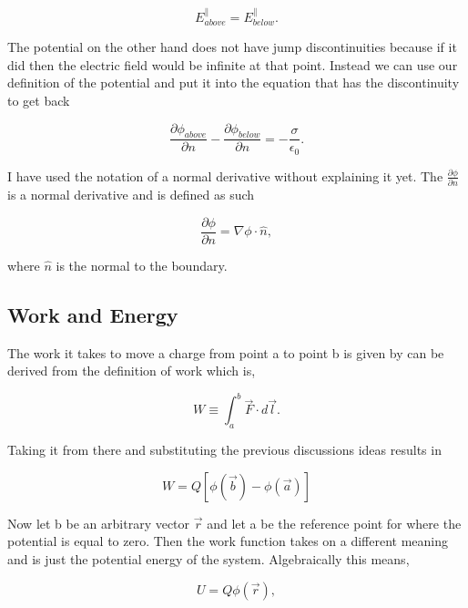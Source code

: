\documentclass[preprint, review,12pt]{elsarticle}
\begin{document}
\begin{equation}
    E_{above}^\parallel = E_{below}^\parallel.
\end{equation}

The potential on the other hand does not have jump discontinuities because if it did then the electric field would be infinite at that point. Instead we can use our definition of the potential and put it into the equation that has the discontinuity to get back

\begin{equation}
    \frac{\partial \phi_{above}}{\partial n} - \frac{\partial \phi_{below}}{\partial n} = -\frac{\sigma}{\epsilon_0}.
\end{equation}

I have used the notation of a normal derivative without explaining it yet. The $\frac{\partial \phi}{\partial n}$ is a normal derivative and is defined as such

\begin{equation}
    \frac{\partial \phi}{\partial n} = \nabla \phi \cdot \hat{n},
\end{equation}

where $\hat{n}$ is the normal to the boundary. 


\subsection{Work and Energy}

The work it takes to move a charge from point a to point b is given by can be derived from the definition of work which is,

\begin{equation}
    W \equiv \int_a^b \vec{F}\cdot d\vec{l}.
\end{equation}

Taking it from there and substituting the previous discussions ideas results in

\begin{equation}
    W = Q[\phi(\vec{b})-\phi(\vec{a})]
\end{equation}

Now let b be an arbitrary vector $\vec{r}$ and let a be the reference point for where the potential is equal to zero. Then the work function takes on a different meaning and is just the potential energy of the system. Algebraically this means,

\begin{equation}
    U = Q\phi(\vec{r}),
\end{equation}
\end{document}
